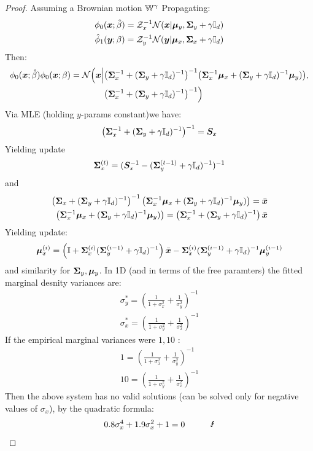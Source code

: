 \documentclass[a4paper,12pt,twoside,openright]{report}
\theoremstyle{definition}
\begin{document}
\begin{proof}
 Assuming a Brownian motion $\mathbb{W}^{\gamma}$ Propagating:
\begin{align*}
\phi_0( {\bm{x}} ; \hat{\beta}) = \mathcal{Z}_x^{-1} {\mathcal{N}}({\bm{x}}| {\bm{\mu}}_y, {\bm{\Sigma}}_y + \gamma {\mathbb{I}_d})  \\
{{\hat{\phi}}}_1( {\bm{y}} ; {\beta}) = \mathcal{Z}_y^{-1}  {\mathcal{N}}({\bm{y}}| {\bm{\mu}}_x, {\bm{\Sigma}}_x + \gamma {\mathbb{I}_d}) 
\end{align*}
Then:
\begin{align*}
 \phi_0( {\bm{x}} ; \hat{\beta})  \phi_0({\bm{x}} ; \beta) = {\mathcal{N}}\Big({\bm{x}} \Big|& \big({\bm{\Sigma}}_x^{-1} + ({\bm{\Sigma}}_y + \gamma {\mathbb{I}_d})^{-1}\big)^{-1}\big( {\bm{\Sigma}}_x^{-1}{\bm{\mu}}_x + ({\bm{\Sigma}}_y + \gamma {\mathbb{I}_d})^{-1}{\bm{\mu}}_y)\big), \\ &\big({\bm{\Sigma}}_x^{-1} + ({\bm{\Sigma}}_y + \gamma {\mathbb{I}_d})^{-1}\big)^{-1} \Big)
\end{align*}
Via MLE (holding $y$-params constant)we have:
\begin{align*}
\left({\bm{\Sigma}}_x^{-1} + ({\bm{\Sigma}}_y + \gamma {\mathbb{I}_d})^{-1}\right)^{-1}  = {\bm{S}}_x 
\end{align*}
Yielding update
\begin{align*}
{\bm{\Sigma}}_x^{(t)} = ({\bm{S}}_x^{-1}  - ({\bm{\Sigma}}_y^{(t-1)} + \gamma {\mathbb{I}_d})^{-1})^{-1} 
\end{align*}
and 
\begin{align*}
\left({\bm{\Sigma}}_x + ({\bm{\Sigma}}_y + \gamma {\mathbb{I}_d})^{-1}\right)^{-1}\left( {\bm{\Sigma}}_x^{-1}{\bm{\mu}}_x + ({\bm{\Sigma}}_y + \gamma {\mathbb{I}_d})^{-1}{\bm{\mu}}_y)\right) = \bar{{\bm{x}}} \\
\left( {\bm{\Sigma}}_x^{-1}{\bm{\mu}}_x + ({\bm{\Sigma}}_y + \gamma {\mathbb{I}_d})^{-1}{\bm{\mu}}_y)\right) = \left({\bm{\Sigma}}_x^{-1} + ({\bm{\Sigma}}_y + \gamma {\mathbb{I}_d})^{-1}\right)\bar{{\bm{x}}} 
\end{align*}
Yielding update:
\begin{align*}
{\bm{\mu}}_x^{(i)}  = \left(\mathbb{I} + {\bm{\Sigma}}_x^{(i)}({\bm{\Sigma}}_y^{(i-1)} + \gamma {\mathbb{I}_d})^{-1}\right)\bar{{\bm{x}}} -  {\bm{\Sigma}}_x^{(i)}({\bm{\Sigma}}_y^{(i-1)} + \gamma {\mathbb{I}_d})^{-1}{\bm{\mu}}_y^{(i-1)}
\end{align*}
and similarity  for ${\bm{\Sigma}}_y, {\bm{\mu}}_y$.
In 1D (and in terms of the free paramters) the fitted marginal desnity variances are:
\begin{align*}
\sigma_y^{*} = \left(\frac{1}{1+\sigma^2_x} + \frac{1}{\sigma^2_y}\right)^{-1} \\
\sigma_x^{*} = \left(\frac{1}{1+\sigma^2_y} + \frac{1}{\sigma^2_x}\right)^{-1}
\end{align*}
If the empirical marginal variances were $1,10$ :
\begin{align*}
1 = \left(\frac{1}{1+\sigma^2_x} + \frac{1}{\sigma^2_y}\right)^{-1} \\
10 = \left(\frac{1}{1+\sigma^2_y} + \frac{1}{\sigma^2_x}\right)^{-1}
\end{align*}
Then the above system has no valid solutions (can be solved only for negative values of $\sigma_x$), by the quadratic formula:
\begin{align*}
0.8 \sigma_x^4 + 1.9 \sigma_x^2 + 1 = 0 \quad \quad \quad \text{\Lightning}
\end{align*}

\end{proof}
\end{document}
